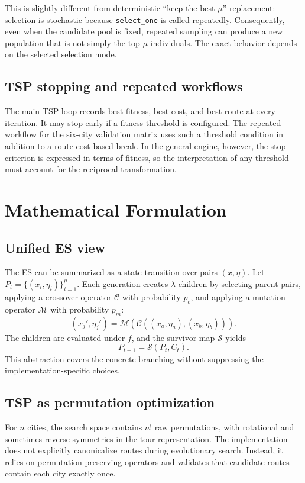 \documentclass[11pt,a4paper]{article}
\newcommand{\code}[1]{\texttt{#1}}
\begin{document}
This is slightly different from deterministic ``keep the best $\mu$'' replacement: selection is stochastic because \code{select\_one} is called repeatedly. Consequently, even when the candidate pool is fixed, repeated sampling can produce a new population that is not simply the top $\mu$ individuals. The exact behavior depends on the selected selection mode.

\subsection{TSP stopping and repeated workflows}
The main TSP loop records best fitness, best cost, and best route at every iteration. It may stop early if a fitness threshold is configured. The repeated workflow for the six-city validation matrix uses such a threshold condition in addition to a route-cost based break. In the general engine, however, the stop criterion is expressed in terms of fitness, so the interpretation of any threshold must account for the reciprocal transformation.

\section{Mathematical Formulation}
\subsection{Unified ES view}
The ES can be summarized as a state transition over pairs $(x,\eta)$. Let $P_t=\{(x_i,\eta_i)\}_{i=1}^{\mu}$. Each generation creates $\lambda$ children by selecting parent pairs, applying a crossover operator $\mathcal{C}$ with probability $p_c$, and applying a mutation operator $\mathcal{M}$ with probability $p_m$:
\begin{equation}
(x_j',\eta_j')=\mathcal{M}\left(\mathcal{C}\left((x_a,\eta_a),(x_b,\eta_b)\right)\right).
\end{equation}
The children are evaluated under $f$, and the survivor map $\mathcal{S}$ yields
\begin{equation}
P_{t+1}=\mathcal{S}(P_t,C_t).
\end{equation}
This abstraction covers the concrete branching without suppressing the implementation-specific choices.

\subsection{TSP as permutation optimization}
For $n$ cities, the search space contains $n!$ raw permutations, with rotational and sometimes reverse symmetries in the tour representation. The implementation does not explicitly canonicalize routes during evolutionary search. Instead, it relies on permutation-preserving operators and validates that candidate routes contain each city exactly once.
\end{document}
